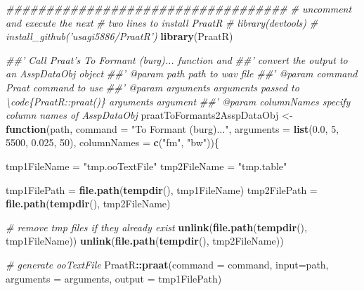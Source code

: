 \documentclass[]{book}
\newenvironment{Shaded}{\begin{snugshade}}{\end{snugshade}}
\newcommand{\CommentTok}[1]{\textcolor[rgb]{0.56,0.35,0.01}{\textit{#1}}}
\newcommand{\ControlFlowTok}[1]{\textcolor[rgb]{0.13,0.29,0.53}{\textbf{#1}}}
\newcommand{\DataTypeTok}[1]{\textcolor[rgb]{0.13,0.29,0.53}{#1}}
\newcommand{\DecValTok}[1]{\textcolor[rgb]{0.00,0.00,0.81}{#1}}
\newcommand{\FloatTok}[1]{\textcolor[rgb]{0.00,0.00,0.81}{#1}}
\newcommand{\KeywordTok}[1]{\textcolor[rgb]{0.13,0.29,0.53}{\textbf{#1}}}
\newcommand{\NormalTok}[1]{#1}
\newcommand{\OperatorTok}[1]{\textcolor[rgb]{0.81,0.36,0.00}{\textbf{#1}}}
\newcommand{\StringTok}[1]{\textcolor[rgb]{0.31,0.60,0.02}{#1}}
\begin{document}
\begin{Shaded}
\begin{Highlighting}[]
\CommentTok{###################################}
\CommentTok{# uncomment and execute the next }
\CommentTok{# two lines to install PraatR}
\CommentTok{# library(devtools)}
\CommentTok{# install_github('usagi5886/PraatR')}
\KeywordTok{library}\NormalTok{(PraatR)}

\CommentTok{##' Call Praat's To Formant (burg)... function and }
\CommentTok{##' convert the output to an AsspDataObj object}
\CommentTok{##' @param path path to wav file}
\CommentTok{##' @param command Praat command to use}
\CommentTok{##' @param arguments arguments passed to \textbackslash{}code\{PraatR::praat()\} arguments argument}
\CommentTok{##' @param columnNames specify column names of AsspDataObj}
\NormalTok{praatToFormants2AsspDataObj <-}\StringTok{ }\ControlFlowTok{function}\NormalTok{(path,}
                                        \DataTypeTok{command =} \StringTok{"To Formant (burg)..."}\NormalTok{,}
                                        \DataTypeTok{arguments =} \KeywordTok{list}\NormalTok{(}\FloatTok{0.0}\NormalTok{, }
                                                         \DecValTok{5}\NormalTok{, }
                                                         \DecValTok{5500}\NormalTok{, }
                                                         \FloatTok{0.025}\NormalTok{, }
                                                         \DecValTok{50}\NormalTok{), }
                                        \DataTypeTok{columnNames =} \KeywordTok{c}\NormalTok{(}\StringTok{"fm"}\NormalTok{, }\StringTok{"bw"}\NormalTok{))\{}
  
\NormalTok{  tmp1FileName =}\StringTok{ "tmp.ooTextFile"}
\NormalTok{  tmp2FileName =}\StringTok{ "tmp.table"}
  
\NormalTok{  tmp1FilePath =}\StringTok{ }\KeywordTok{file.path}\NormalTok{(}\KeywordTok{tempdir}\NormalTok{(), tmp1FileName)}
\NormalTok{  tmp2FilePath =}\StringTok{ }\KeywordTok{file.path}\NormalTok{(}\KeywordTok{tempdir}\NormalTok{(), tmp2FileName)}
  
  \CommentTok{# remove tmp files if they already exist}
  \KeywordTok{unlink}\NormalTok{(}\KeywordTok{file.path}\NormalTok{(}\KeywordTok{tempdir}\NormalTok{(), tmp1FileName))}
  \KeywordTok{unlink}\NormalTok{(}\KeywordTok{file.path}\NormalTok{(}\KeywordTok{tempdir}\NormalTok{(), tmp2FileName))}
  
  \CommentTok{# generate ooTextFile}
\NormalTok{  PraatR}\OperatorTok{::}\KeywordTok{praat}\NormalTok{(}\DataTypeTok{command =}\NormalTok{ command, }
                \DataTypeTok{input=}\NormalTok{path, }
                \DataTypeTok{arguments =}\NormalTok{ arguments, }
                \DataTypeTok{output =}\NormalTok{ tmp1FilePath)}
  

\end{Highlighting}
\end{Shaded}
\end{document}
